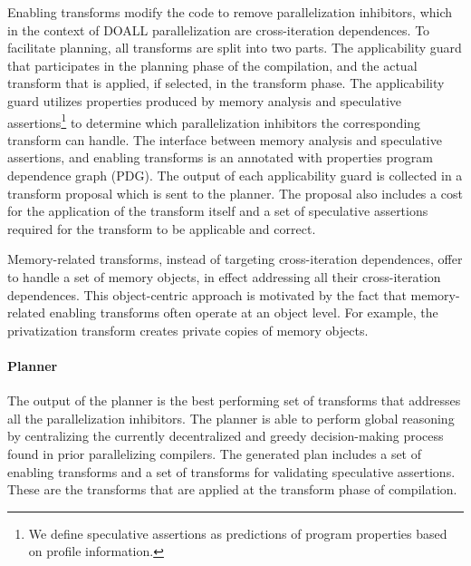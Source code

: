 Enabling transforms modify the code to remove parallelization
inhibitors, which in the context of DOALL parallelization are
cross-iteration dependences.
%
To facilitate planning, all transforms are split into two parts.
The applicability guard that participates in the planning phase of the
compilation, and the actual transform that is applied, if
selected, in the transform phase.
The applicability guard utilizes properties produced by memory
analysis and speculative assertions\footnote{We define speculative
assertions as predictions of program properties based on profile
information.} to determine which parallelization inhibitors the
corresponding transform can handle.
%
The interface between memory analysis and speculative assertions, and
enabling transforms is an annotated with properties program dependence
graph (PDG).
%
%
The output of each applicability guard is collected in a
transform proposal which is sent to the planner.
%
%
The proposal also includes a cost for the application of the
transform itself and a set of speculative assertions required
for the transform to be applicable and correct.

Memory-related transforms, instead of targeting cross-iteration
dependences, offer to handle a set of memory objects, in effect
addressing all their cross-iteration dependences. This object-centric
approach is motivated by the fact that memory-related enabling
transforms often operate at an object level. For example, the
privatization transform creates private copies of memory objects.

\paragraph{Planner}

%
The output of the planner is the best performing set of
transforms that addresses all the parallelization inhibitors.
%
The planner is able to perform global reasoning by centralizing the
currently decentralized and greedy decision-making process found in
prior parallelizing compilers.
%
The generated plan includes a set of enabling transforms and a
set of transforms for validating speculative assertions.
%
These are the transforms that are applied at the transform
phase of compilation.

